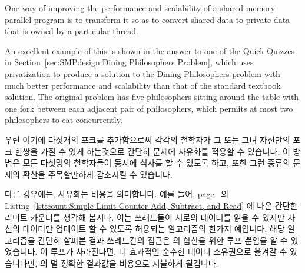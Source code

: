 One way of improving the performance and scalability of a shared-memory
parallel program is to transform it so as to convert shared data to
private data that is owned by a particular thread.

An excellent example of this is shown in the answer to one of the
Quick Quizzes in
Section~\ref{sec:SMPdesign:Dining Philosophers Problem},
which uses privatization to produce a solution to the
Dining Philosophers problem with much better performance and scalability
than that of the standard textbook solution.
The original problem has five philosophers sitting around the table
with one fork between each adjacent pair of philosophers, which permits
at most two philosophers to eat concurrently.
\fi

우린 여기에 다섯개의 포크를 추가함으로써 각각의 철학자가 그 또는 그녀 자신만의
포크 한쌍을 가질 수 있게 하는것으로 간단히 문제에 사유화를 적용할 수 있습니다.
이 방법은 모든 다섯명의 철학자들이 동시에 식사를 할 수 있도록 하고, 또한 그런
종류의 문제의 확산을 주목할만하게 감소시킬 수 있습니다.

다른 경우에는, 사유화는 비용을 의미합니다.
예를 들어,
page~\pageref{lst:count:Simple Limit Counter Add, Subtract, and Read} 의
Listing~\ref{lst:count:Simple Limit Counter Add, Subtract, and Read} 에 나온
간단한 리미트 카운터를 생각해 봅시다.
이는 쓰레드들이 서로의 데이터를 읽을 수 있지만 자신의 데이터만 업데이트 할 수
있도록 허용되는 알고리즘의 한가지 예입니다.
해당 알고리즘을 간단히 살펴본 결과 쓰레드간의 접근은  의
합산을 위한 루프 뿐임을 알 수 있었습니다.
이 루프가 사라진다면, 더 효과적인 순수한 데이터 소유권으로 옮겨갈 수
있습니다만,  의 덜 정확한 결과값을 비용으로 지불하게 될겁니다.
\iffalse

We can trivially privatize this problem by providing an additional five
forks, so that each philosopher has his or her own private pair of forks.
This allows all five philosophers to eat concurrently, and also offers
a considerable reduction in the spread of certain types of disease.

In other cases, privatization imposes costs.
For example, consider the simple limit counter shown in
Listing~\ref{lst:count:Simple Limit Counter Add, Subtract, and Read} on
page~\pageref{lst:count:Simple Limit Counter Add, Subtract, and Read}.
This is an example of an algorithm where threads can read each others'
data, but are only permitted to update their own data.
A quick review of the algorithm shows that the only cross-thread
accesses are in the summation loop in \co{read_count()}.
If this loop is eliminated, we move to the more-efficient pure
data ownership, but at the cost of a less-accurate result
from \co{read_count()}.
\fi

